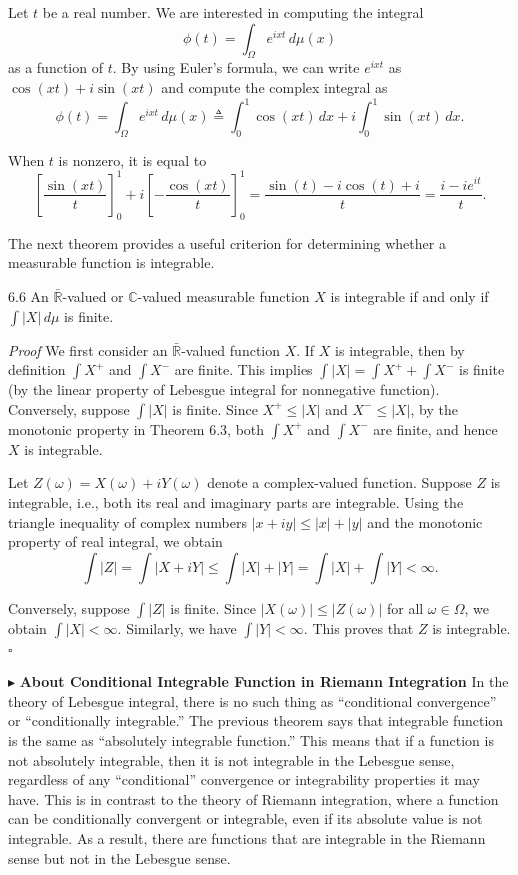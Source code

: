 Let $t$ be a real number. We are interested in computing the integral
\[
\phi(t)=\int_{\Omega} e^{ixt}\, d\mu(x)
\]
as a function of $t$. By using Euler's formula, we can write $e^{ixt}$ as $\cos(xt)+i\sin(xt)$ and compute the complex integral as
\[
\phi(t)=\int_{\Omega} e^{ixt}\, d\mu(x)
\triangleq \int_{0}^{1} \cos(xt)\, dx + i\int_{0}^{1} \sin(xt)\, dx.
\]

When $t$ is nonzero, it is equal to
\[
\left[\frac{\sin(xt)}{t}\right]_{0}^{1}
+i\left[-\frac{\cos(xt)}{t}\right]_{0}^{1}
=\frac{\sin(t)-i\cos(t)+i}{t}
=\frac{i-ie^{it}}{t}.
\]

The next theorem provides a useful criterion for determining whether a measurable function is integrable.

\begin{thmbox}{6.6}
An $\bar{\mathbb{R}}$-valued or $\mathbb{C}$-valued measurable function $X$ is integrable if and only if $\int |X|\, d\mu$ is finite.
\end{thmbox}

\textit{Proof} We first consider an $\bar{\mathbb{R}}$-valued function $X$. If $X$ is integrable, then by definition $\int X^+$ and $\int X^-$ are finite. This implies $\int |X|=\int X^+ + \int X^-$ is finite (by the linear property of Lebesgue integral for nonnegative function). Conversely, suppose $\int |X|$ is finite. Since $X^+ \le |X|$ and $X^- \le |X|$, by the monotonic property in Theorem 6.3, both $\int X^+$ and $\int X^-$ are finite, and hence $X$ is integrable.

Let $Z(\omega)=X(\omega)+iY(\omega)$ denote a complex-valued function. Suppose $Z$ is integrable, i.e., both its real and imaginary parts are integrable. Using the triangle inequality of complex numbers $|x+iy|\le |x|+|y|$ and the monotonic property of real integral, we obtain
\[
\int |Z| = \int |X+iY|
\le \int |X|+|Y|
= \int |X|+\int |Y| < \infty.
\]

Conversely, suppose $\int |Z|$ is finite. Since $|X(\omega)|\le |Z(\omega)|$ for all $\omega \in \Omega$, we obtain $\int |X|<\infty$. Similarly, we have $\int |Y|<\infty$. This proves that $Z$ is integrable. \hfill $\square$

\noindent$\blacktriangleright$ \textbf{About Conditional Integrable Function in Riemann Integration} In the theory of Lebesgue integral, there is no such thing as ``conditional convergence'' or ``conditionally integrable.'' The previous theorem says that integrable function is the same as ``absolutely integrable function.'' This means that if a function is not absolutely integrable, then it is not integrable in the Lebesgue sense, regardless of any ``conditional'' convergence or integrability properties it may have. This is in contrast to the theory of Riemann integration, where a function can be conditionally convergent or integrable, even if its absolute value is not integrable. As a result, there are functions that are integrable in the Riemann sense but not in the Lebesgue sense.

